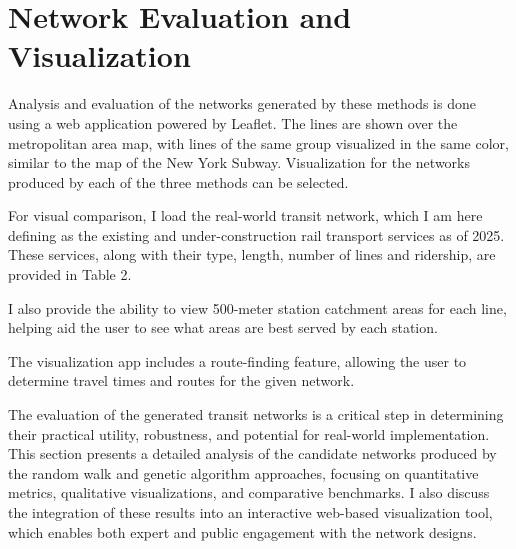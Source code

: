 \documentclass[manuscript]{acmart}
\begin{document}
\section{Network Evaluation and Visualization}

Analysis and evaluation of the networks generated by these methods is done using a web application powered by Leaflet. The lines are shown over the metropolitan area map, with lines of the same group visualized in the same color, similar to the map of the New York Subway. Visualization for the networks produced by each of the three methods can be selected.

For visual comparison, I load the real-world transit network, which I am here defining as the existing and under-construction rail transport services as of 2025. These services, along with their type, length, number of lines and ridership, are provided in Table 2. 

I also provide the ability to view 500-meter station catchment areas for each line, helping aid the user to see what areas are best served by each station.

The visualization app includes a route-finding feature, allowing the user to determine travel times and routes for the given network.

The evaluation of the generated transit networks is a critical step in determining their practical utility, robustness, and potential for real-world implementation. This section presents a detailed analysis of the candidate networks produced by the random walk and genetic algorithm approaches, focusing on quantitative metrics, qualitative visualizations, and comparative benchmarks. I also discuss the integration of these results into an interactive web-based visualization tool, which enables both expert and public engagement with the network designs.
\end{document}
